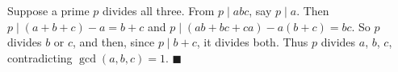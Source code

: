 Suppose a prime $p$ divides all three. From $p\mid abc$, say $p\mid a$. Then $p\mid(a+b+c)-a=b+c$ and $p\mid(ab+bc+ca)-a(b+c)=bc$. So $p$ divides $b$ or $c$, and then, since $p\mid b+c$, it divides both. Thus $p$ divides $a$, $b$, $c$, contradicting $\gcd(a,b,c)=1$. $\blacksquare$
